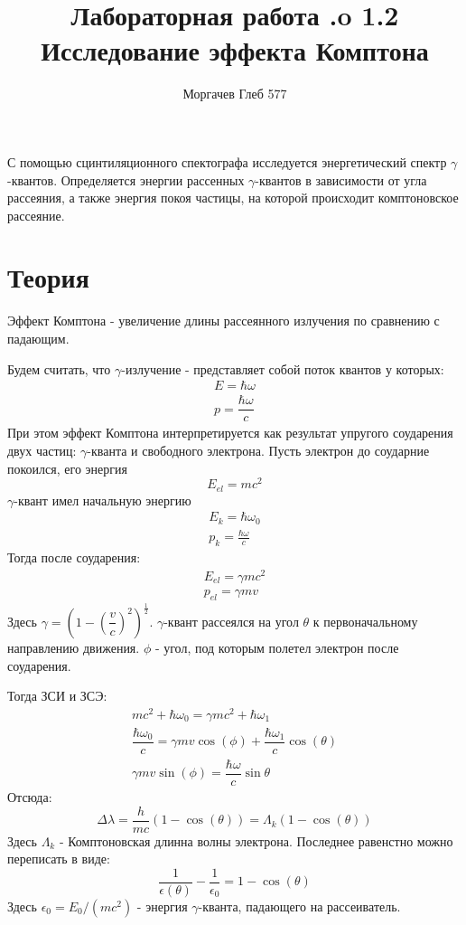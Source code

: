 \documentclass[12pt]{article}
\author{Моргачев Глеб 577}
\title{\textbf{Лабораторная работа \textnumer.o 1.2} \\{Исследование эффекта Комптона}}
\date{}
\begin{document}
	\maketitle

	С помощью сцинтиляционного спектографа исследуется энергетический спектр $\gamma$\--квантов.
	Определяется энергии рассенных $\gamma$\--квантов в зависимости от угла рассеяния, а также энергия покоя частицы, на которой происходит комптоновское рассеяние.
	\section*{Теория}
	
		Эффект Комптона \-- увеличение длины рассеянного излучения по сравнению с падающим.
		
		Будем считать, что $\gamma$\--излучение \-- представляет собой поток квантов у которых:
		\begin{eqnarray}
		    E = \hbar\omega \\
			p = \dfrac{\hbar\omega}{c}
		\end{eqnarray}
        При этом эффект Комптона интерпретируется как результат упругого соударения двух частиц: $\gamma$\--кванта и свободного электрона. 
		Пусть электрон до соударние покоился, его энергия 
		\begin{equation}
			E_{el} = mc^2
		\end{equation}
		$\gamma$\--квант имел начальную энергию 
		\begin{eqnarray}
		    E_k = \hbar\omega_0 \\
			p_k = \frac{\hbar\omega}{c}
		\end{eqnarray}
		Тогда после соударения:
		\begin{eqnarray}
			E_{el} = \gamma mc^2 \\
			p_{el} = \gamma mv
		\end{eqnarray}
		Здесь $\gamma = \left(1 - \left(\dfrac{v}{c}\right)^2\right)^\frac{1}{2}$.
		$\gamma$\--квант рассеялся на угол $\theta$ к первоначальному направлению движения.
		$\phi$ \-- угол, под которым полетел электрон после соударения.
		
		Тогда ЗСИ и ЗСЭ:
		\begin{eqnarray}
			mc^2 + \hbar\omega_0 = \gamma mc^2 + \hbar\omega_1 \\
			\dfrac{\hbar\omega_0}{c} = \gamma mv\cos(\phi) + \dfrac{\hbar\omega_1}{c}\cos(\theta) \\
			\gamma mv \sin(\phi) = \dfrac{\hbar\omega}{c}\sin{\theta}
		\end{eqnarray}
		Отсюда:
		\begin{equation}
			\Delta\lambda = \dfrac{h}{mc}(1 - \cos(\theta)) = \Lambda_k(1 - \cos(\theta))
		\end{equation}
		Здесь $\Lambda_k$ \-- Комптоновская длинна волны электрона.
		Последнее равенстно можно переписать в виде:
		\begin{equation}
			\dfrac{1}{\epsilon(\theta)} - \dfrac{1}{\epsilon_0} = 1 - \cos(\theta)
		\end{equation}
		Здесь $\epsilon_0 = E_0/(mc^2)$ \-- энергия $\gamma$\--кванта, падающего на рассеиватель.
		
\end{document}
